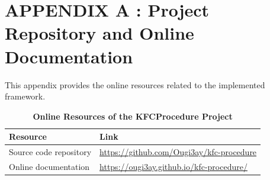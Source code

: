\section*{APPENDIX A : Project Repository and Online Documentation}
\label{app:project_repository_documentation}

This appendix provides the online resources related to the implemented \KFCProcedure{} framework.

\begin{table}[H]
      \centering
      \captionsetup{list=false}
      \caption*{\textbf{Online Resources of the KFCProcedure Project}}
      \renewcommand{\arraystretch}{1.2}

      \begin{tabularx}{\textwidth}{
            >{\raggedright\arraybackslash}p{4cm}
            >{\raggedright\arraybackslash}X
      }
            \toprule
            \textbf{Resource} & \textbf{Link} \\
            \midrule
            Source code repository &
            \url{https://github.com/Ougi3ay/kfc-procedure} \\

            Online documentation &
            \url{https://ougi3ay.github.io/kfc-procedure/} \\
            \bottomrule
      \end{tabularx}
\end{table}